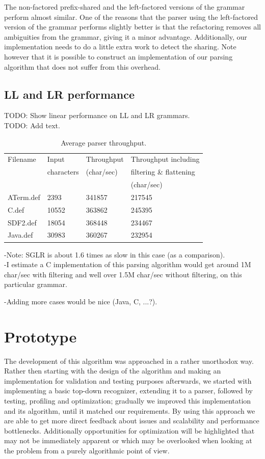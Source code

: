 \documentclass[a4paper,10pt]{article}
\begin{document}
The non-factored prefix-shared and the left-factored versions of the grammar perform almost similar. One of the reasons that the parser using the left-factored version of the grammar performs slightly better is that the refactoring removes all ambiguities from the grammar, giving it a minor advantage. Additionally, our implementation needs to do a little extra work to detect the sharing. Note however that it is possible to construct an implementation of our parsing algorithm that does not suffer from this overhead.

\pagebreak
\subsection{LL and LR performance}

TODO: Show linear performance on LL and LR grammars.\\
TODO: Add text.

\begin{table}[H]
\centering
\begin{tabular}{ | p{5em} | p{5em} | p{6em} | p{10em} |}
  \hline
  Filename & Input & Throughput & Throughput including\\
   & characters & (char/sec) & filtering \& flattening\\
   & & & (char/sec)\\
  \hline
  ATerm.def & 2393 & 341857 & 217545\\
  C.def & 10552 & 363862 & 245395\\
  SDF2.def & 18054 & 368448 & 234467\\
  Java.def & 30983 & 360267 & 232954\\
  \hline
\end{tabular}
\caption{Average parser throughput.}
\end{table}

-Note: SGLR is about 1.6 times as slow in this case (as a comparison).\\
-I estimate a C implementation of this parsing algorithm would get around 1M char/sec with filtering and well over 1.5M char/sec without filtering, on this particular grammar.

-Adding more cases would be nice (Java, C, ...?).

\section{Prototype}

The development of this algorithm was approached in a rather unorthodox way. Rather then starting with the design of the algorithm and making an implementation for validation and testing purposes afterwards, we started with implementing a basic top-down recognizer, extending it to a parser, followed by testing, profiling and optimization; gradually we improved this implementation and its algorithm, until it matched our requirements. By using this approach we are able to get more direct feedback about issues and scalability and performance bottlenecks. Additionally opportunities for optimization will be highlighted that may not be immediately apparent or which may be overlooked when looking at the problem from a purely algorithmic point of view.
\end{document}

